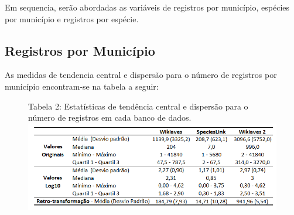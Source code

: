 \documentclass[12pt]{extarticle}
\newenvironment{resposta}{ \color{mygray}}{}
\begin{document}
\begin{resposta}
Em sequencia, serão abordadas as variáveis de registros por município, espécies por município e registros por espécie.
\end{resposta}

\subsection{Registros por Município}

\begin{resposta}
As medidas de tendencia central e dispersão para o número de registros por município encontram-se na tabela a seguir: 
\end{resposta}

\begin{figure}[h!]
\centering
{\scriptsize Tabela 2: Estatísticas de tendência central e dispersão para o número de registros em cada banco de dados.}
\includegraphics{Imagens/T02.png}
\end{figure}

\newpage
\end{document}
